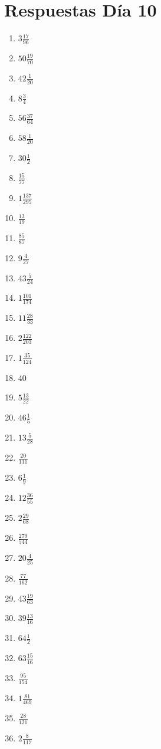 \documentclass[12pt]{article}
\begin{document}
\section*{Respuestas Día 10}
\begin{enumerate}
\item $ 3 \frac{17}{96} $
\item $ 50 \frac{19}{70} $
\item $ 42 \frac{1}{20} $
\item $ 8 \frac{3}{4} $
\item $ 56 \frac{37}{64} $
\item $ 58 \frac{1}{20} $
\item $ 30 \frac{1}{2} $
\item $ \frac{15}{77} $
\item $ 1 \frac{137}{295} $
\item $ \frac{13}{19} $
\item $ \frac{85}{87} $
\item $ 9 \frac{4}{27} $
\item $ 43 \frac{5}{24} $
\item $ 1 \frac{101}{174} $
\item $ 11 \frac{28}{33} $
\item $ 2 \frac{122}{203} $
\item $ 1 \frac{35}{124} $
\item $ 40 $
\item $ 5 \frac{13}{22} $
\item $ 46 \frac{1}{5} $
\item $ 13 \frac{5}{28} $
\item $ \frac{20}{111} $
\item $ 6 \frac{1}{9} $
\item $ 12 \frac{36}{55} $
\item $ 2 \frac{29}{68} $
\item $ \frac{279}{544} $
\item $ 20 \frac{4}{25} $
\item $ \frac{77}{162} $
\item $ 43 \frac{19}{63} $
\item $ 39 \frac{13}{16} $
\item $ 64 \frac{1}{2} $
\item $ 63 \frac{15}{16} $
\item $ \frac{95}{154} $
\item $ 1 \frac{81}{469} $
\item $ \frac{28}{121} $
\item $ 2 \frac{8}{117} $

\end{enumerate}
\end{document}
